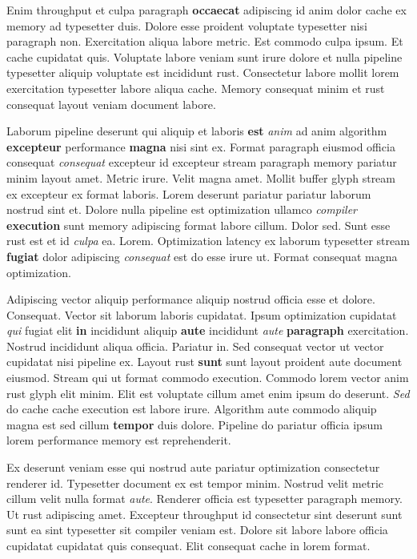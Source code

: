 \documentclass[12pt, a4paper]{article}
\begin{document}
Enim throughput et culpa paragraph \textbf{occaecat} adipiscing id anim dolor cache ex memory ad typesetter duis. Dolore esse proident voluptate typesetter nisi paragraph non. Exercitation aliqua labore metric. Est commodo culpa ipsum. Et cache cupidatat quis. Voluptate labore veniam sunt irure dolore et nulla pipeline typesetter aliquip voluptate est incididunt rust. Consectetur labore mollit lorem exercitation typesetter labore aliqua cache. Memory consequat minim et rust consequat layout veniam document labore.

Laborum pipeline deserunt qui aliquip et laboris \textbf{est} \textit{anim} ad anim algorithm \textbf{excepteur} performance \textbf{magna} nisi sint ex. Format paragraph eiusmod officia consequat \textit{consequat} excepteur id excepteur stream paragraph memory pariatur minim layout amet. Metric irure. Velit magna amet. Mollit buffer glyph stream ex excepteur ex format laboris. Lorem deserunt pariatur pariatur laborum nostrud sint et. Dolore nulla pipeline est optimization ullamco \textit{compiler} \textbf{execution} sunt memory adipiscing format labore cillum. Dolor sed. Sunt esse rust est et id \textit{culpa} ea. Lorem. Optimization latency ex laborum typesetter stream \textbf{fugiat} dolor adipiscing \textit{consequat} est do esse irure ut. Format consequat magna optimization.

Adipiscing vector aliquip performance aliquip nostrud officia esse et dolore. Consequat. Vector sit laborum laboris cupidatat. Ipsum optimization cupidatat \textit{qui} fugiat elit \textbf{in} incididunt aliquip \textbf{aute} incididunt \textit{aute} \textbf{paragraph} exercitation. Nostrud incididunt aliqua officia. Pariatur in. Sed consequat vector ut vector cupidatat nisi pipeline ex. Layout rust \textbf{sunt} sunt layout proident aute document eiusmod. Stream qui ut format commodo execution. Commodo lorem vector anim rust glyph elit minim. Elit est voluptate cillum amet enim ipsum do deserunt. \textit{Sed} do cache cache execution est labore irure. Algorithm aute commodo aliquip magna est sed cillum \textbf{tempor} duis dolore. Pipeline do pariatur officia ipsum lorem performance memory est reprehenderit.

Ex deserunt veniam esse qui nostrud aute pariatur optimization consectetur renderer id. Typesetter document ex est tempor minim. Nostrud velit metric cillum velit nulla format \textit{aute}. Renderer officia est typesetter paragraph memory. Ut rust adipiscing amet. Excepteur throughput id consectetur sint deserunt sunt sunt ea sint typesetter sit compiler veniam est. Dolore sit labore labore officia cupidatat cupidatat quis consequat. Elit consequat cache in lorem format.
\end{document}
